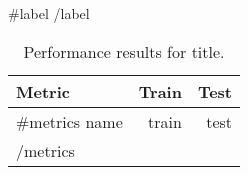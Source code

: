 \begin{table}[ht]
  \centering
  \caption{Performance results for {{title}}.}
  {{#label}}
  \label{tab:{{label}}-performance}
  {{/label}}
  \begin{tabular}{lrr}
    \toprule
    Metric & Train&Test\\
    \midrule
    {{#metrics}}
      {{name}} & {{train}} & {{test}}  \\
    {{/metrics}}
    \bottomrule
  \end{tabular}
\end{table}
